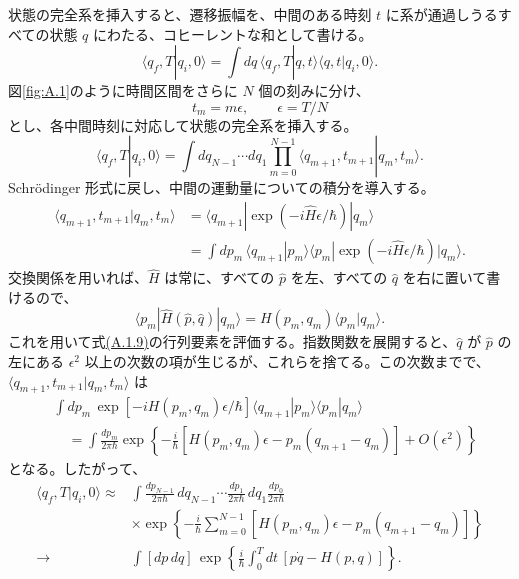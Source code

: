 状態の完全系を挿入すると、遷移振幅を、中間のある時刻 $t$ に系が通過しうるすべての状態 $q$ にわたる、コヒーレントな和として書ける。
\begin{equation}
\langle q_f,T|q_i,0\rangle
=\int dq\,\langle q_f,T|q,t\rangle\langle q,t|q_i,0\rangle.
\tag{A.1.6}\label{eq:A.1.6}
\end{equation}
図\ref{fig:A.1}のように時間区間をさらに $N$ 個の刻みに分け、
\begin{equation}
t_m=m\epsilon,\qquad\epsilon=T/N
\tag{A.1.7}\label{eq:A.1.7}
\end{equation}
とし、各中間時刻に対応して状態の完全系を挿入する。
\begin{equation}
\langle q_f,T|q_i,0\rangle
=\int dq_{N-1}\cdots dq_1
\prod_{m=0}^{N-1}\langle q_{m+1},t_{m+1}|q_m,t_m\rangle.
\tag{A.1.8}\label{eq:A.1.8}
\end{equation}
Schrödinger 形式に戻し、中間の運動量についての積分を導入する。
\begin{equation}
\begin{aligned}
\langle q_{m+1},t_{m+1}|q_m,t_m\rangle
&=\langle q_{m+1}|\exp(-i\hat H\epsilon/\hbar)|q_m\rangle\\
&=\int dp_m\,\langle q_{m+1}|p_m\rangle
\langle p_m|\exp(-i\hat H\epsilon/\hbar)|q_m\rangle.
\end{aligned}
\tag{A.1.9}\label{eq:A.1.9}
\end{equation}
交換関係を用いれば、$\hat H$ は常に、すべての $\hat p$ を左、すべての $\hat q$ を右に置いて書けるので、
\begin{equation}
\langle p_m|\hat H(\hat p,\hat q)|q_m\rangle
=H(p_m,q_m)\langle p_m|q_m\rangle.
\tag{A.1.10}\label{eq:A.1.10}
\end{equation}
これを用いて式\hyperref[eq:A.1.9]{(A.1.9)}の行列要素を評価する。指数関数を展開すると、$\hat q$ が $\hat p$ の左にある $\epsilon^2$ 以上の次数の項が生じるが、これらを捨てる。この次数までで、$\langle q_{m+1},t_{m+1}|q_m,t_m\rangle$ は
\begin{equation}
\begin{aligned}
&\int dp_m\,\exp[-iH(p_m,q_m)\epsilon/\hbar]
\langle q_{m+1}|p_m\rangle\langle p_m|q_m\rangle\\
&\quad=\int\frac{dp_m}{2\pi\hbar}
\exp\left\{-\frac i\hbar
[H(p_m,q_m)\epsilon-p_m(q_{m+1}-q_m)]
+O(\epsilon^2)\right\}
\end{aligned}
\tag{A.1.11}\label{eq:A.1.11}
\end{equation}
となる。したがって、
\begin{equation}
\begin{aligned}
\langle q_f,T|q_i,0\rangle
\approx{}&\int\frac{dp_{N-1}}{2\pi\hbar}\,dq_{N-1}\cdots
\frac{dp_1}{2\pi\hbar}\,dq_1\frac{dp_0}{2\pi\hbar}\\
&\times\exp\left\{-\frac i\hbar
\sum_{m=0}^{N-1}
[H(p_m,q_m)\epsilon-p_m(q_{m+1}-q_m)]\right\}\\
\longrightarrow{}&\int[dp\,dq]\,
\exp\left\{\frac i\hbar\int_0^Tdt\,[p\dot q-H(p,q)]\right\}.
\end{aligned}
\tag{A.1.12}\label{eq:A.1.12}
\end{equation}
